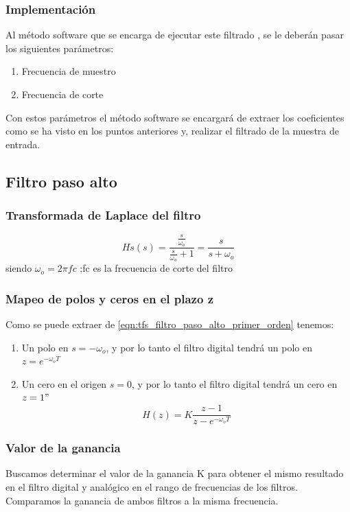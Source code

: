 \documentclass[titlepage]{article}
\begin{document}
\subsubsection{Implementación}
Al método software que se encarga de ejecutar este filtrado , se le deberán pasar los siguientes parámetros:
\begin{enumerate}
\item Frecuencia de muestro 
\item Frecuencia de corte
\end{enumerate}
Con estos parámetros el método software se encargará de extraer los coeficientes como se ha visto en los puntos anteriores y, realizar el filtrado de la muestra de entrada.





\subsection{Filtro paso alto}
\subsubsection{Transformada de Laplace del filtro}
\begin{equation}
\label{eqn:tfs_filtro_paso_alto_primer_orden} Hs(s)=\frac{\displaystyle\frac{s}{\omega_o}}{\displaystyle\frac{s}{{\omega_o}}+1} = \frac{s}{s+\omega_o}
\end{equation}
\quad siendo ${\omega_o}=2{\pi}fc$ ;fc es la frecuencia de corte del filtro 
\subsubsection{Mapeo de polos y ceros en el plazo z}
Como se puede extraer de \ref{eqn:tfs_filtro_paso_alto_primer_orden} tenemos:

\begin{enumerate}
\item Un polo en $s=-{\omega_o}$, y por lo tanto el filtro digital tendrá un polo en $z=e^{-\omega_oT}$ 
\item Un cero en el origen $s=0$, y por lo tanto el filtro digital tendrá un cero en $z=1"$
	\begin{equation}
		H(z)=K\frac{z-1}{z-e^{-\omega_oT}} 
	\end{equation}
\end{enumerate}

\subsubsection{Valor de la ganancia}
Buscamos determinar el valor de la ganancia K para obtener el mismo resultado en el filtro digital y analógico en el rango de frecuencias de los filtros. Comparamos la ganancia de ambos filtros a la misma frecuencia.
\end{document}
